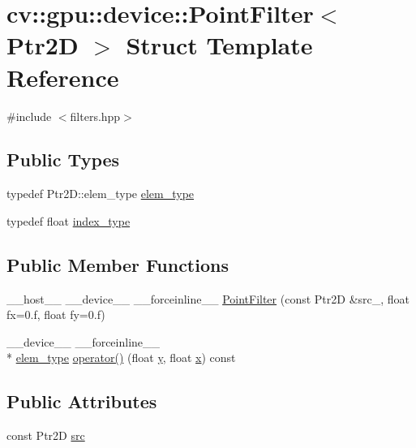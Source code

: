 \hypertarget{structcv_1_1gpu_1_1device_1_1PointFilter}{\section{cv\-:\-:gpu\-:\-:device\-:\-:Point\-Filter$<$ Ptr2\-D $>$ Struct Template Reference}
\label{structcv_1_1gpu_1_1device_1_1PointFilter}
}


{\ttfamily \#include $<$filters.\-hpp$>$}

\subsection*{Public Types}
\begin{DoxyCompactItemize}
\item 
typedef Ptr2\-D\-::elem\-\_\-type \hyperlink{structcv_1_1gpu_1_1device_1_1PointFilter_a3a1755a1076c648a5a5787106b215d21}{elem\-\_\-type}
\item 
typedef float \hyperlink{structcv_1_1gpu_1_1device_1_1PointFilter_a90b4dc29fbd3e45c1521d5a82fd8ddde}{index\-\_\-type}
\end{DoxyCompactItemize}
\subsection*{Public Member Functions}
\begin{DoxyCompactItemize}
\item 
\-\_\-\-\_\-host\-\_\-\-\_\- \-\_\-\-\_\-device\-\_\-\-\_\- \-\_\-\-\_\-forceinline\-\_\-\-\_\- \hyperlink{structcv_1_1gpu_1_1device_1_1PointFilter_aebc6f745589f986ed3565fdc5fbe3fa3}{Point\-Filter} (const Ptr2\-D \&src\-\_\-, float fx=0.f, float fy=0.f)
\item 
\-\_\-\-\_\-device\-\_\-\-\_\- \-\_\-\-\_\-forceinline\-\_\-\-\_\- \\*
\hyperlink{structcv_1_1gpu_1_1device_1_1PointFilter_a3a1755a1076c648a5a5787106b215d21}{elem\-\_\-type} \hyperlink{structcv_1_1gpu_1_1device_1_1PointFilter_a72b69c1859fe402624369c58384a160f}{operator()} (float \hyperlink{highgui__c_8h_af1202c02b14870c18fb3a1da73e9e7c7}{y}, float \hyperlink{highgui__c_8h_a6150e0515f7202e2fb518f7206ed97dc}{x}) const 
\end{DoxyCompactItemize}
\subsection*{Public Attributes}
\begin{DoxyCompactItemize}
\item 
const Ptr2\-D \hyperlink{structcv_1_1gpu_1_1device_1_1PointFilter_a9d3fadd4e0e05e6a022e593f432f1727}{src}
\end{DoxyCompactItemize}


